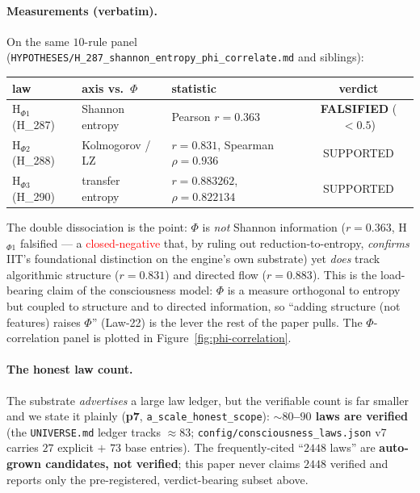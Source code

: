 \documentclass[11pt]{article}
\begin{document}
\paragraph{Measurements (verbatim).} On the same $10$-rule panel
(\texttt{HYPOTHESES/H\_287\_shannon\_entropy\_phi\_correlate.md} and siblings):
\begin{center}
\begin{tabular}{lllc}
\toprule
law & axis vs.\ $\Phi$ & statistic & verdict \\
\midrule
H$_{\Phi 1}$ (H\_287) & Shannon entropy & Pearson $r=0.363$ & \textbf{FALSIFIED} ($<0.5$) \\
H$_{\Phi 2}$ (H\_288) & Kolmogorov / LZ & $r=0.831$, Spearman $\rho=0.936$ & SUPPORTED \\
H$_{\Phi 3}$ (H\_290) & transfer entropy & $r=0.883262$, $\rho=0.822134$ & SUPPORTED \\
\bottomrule
\end{tabular}
\end{center}
The double dissociation is the point: $\Phi$ is \emph{not} Shannon information
($r=0.363$, H$_{\Phi 1}$ falsified --- a \textcolor{red}{closed-negative} that, by
ruling out reduction-to-entropy, \emph{confirms} IIT's foundational distinction on
the engine's own substrate) yet \emph{does} track algorithmic structure ($r=0.831$)
and directed flow ($r=0.883$). This is the load-bearing claim of the consciousness
model: $\Phi$ is a measure orthogonal to entropy but coupled to structure and to
directed information, so ``adding structure (not features) raises $\Phi$'' (Law-22) is
the lever the rest of the paper pulls. The $\Phi$-correlation panel is plotted in
Figure~\ref{fig:phi-correlation}.

\paragraph{The honest law count.} The substrate \emph{advertises} a large law ledger,
but the verifiable count is far smaller and we state it plainly (\textbf{p7},
\texttt{a\_scale\_honest\_scope}): \textbf{$\sim$$80$--$90$ laws are verified}
(the \texttt{UNIVERSE.md} ledger tracks $\approx83$; \texttt{config/consciousness\_laws.json}
v7 carries $27$ explicit $+$ $73$ base entries). The frequently-cited
``$2448$ laws'' are \textbf{auto-grown candidates, not verified}; this paper never
claims $2448$ verified and reports only the pre-registered, verdict-bearing subset above.
\end{document}
